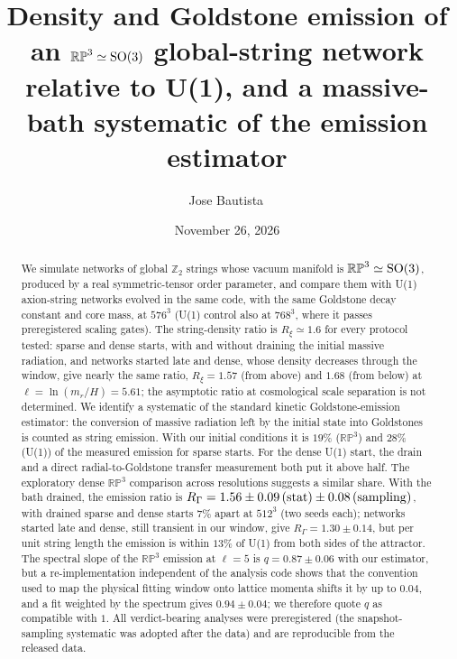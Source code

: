 \documentclass[prd,twocolumn,superscriptaddress,nofootinbib,amsmath,amssymb]{revtex4-2}
\newcommand{\RP}{\mathbb{RP}^3}
\newcommand{\Ztwo}{\mathbb{Z}_2}
\newcommand{\RG}{R_\Gamma}
\newcommand{\Rxi}{R_\xi}
\begin{document}
\title{Density and Goldstone emission of an \texorpdfstring{$\RP\simeq{\rm SO}(3)$}{RP3 = SO(3)} global-string network relative to U(1), and a massive-bath systematic of the emission estimator}
\author{Jose Bautista\,}
\date{November 26, 2026}

\begin{abstract}
We simulate networks of global $\Ztwo$ strings whose vacuum manifold is $\RP\simeq{\rm SO}(3)$, produced by a real symmetric-tensor order parameter, and compare them with U(1) axion-string networks evolved in the same code, with the same Goldstone decay constant and core mass, at $576^3$ (U(1) control also at $768^3$, where it passes preregistered scaling gates).
The string-density ratio is $\Rxi\simeq1.6$ for every protocol tested: sparse and dense starts, with and without draining the initial massive radiation, and networks started late and dense, whose density decreases through the window, give nearly the same ratio, $\Rxi=1.57$ (from above) and $1.68$ (from below) at $\ell=\ln(m_r/H)=5.61$; the asymptotic ratio at cosmological scale separation is not determined.
We identify a systematic of the standard kinetic Goldstone-emission estimator: the conversion of massive radiation left by the initial state into Goldstones is counted as string emission.
With our initial conditions it is $19\%$ ($\RP$) and $28\%$ (U(1)) of the measured emission for sparse starts. For the dense U(1) start, the drain and a direct radial-to-Goldstone transfer measurement both put it above half. The exploratory dense $\RP$ comparison across resolutions suggests a similar share.
With the bath drained, the emission ratio is $\RG=1.56\pm0.09\,({\rm stat})\pm0.08\,({\rm sampling})$, with drained sparse and dense starts $7\%$ apart at $512^3$ (two seeds each); networks started late and dense, still transient in our window, give $\RG=1.30\pm0.14$, but per unit string length the emission is within $13\%$ of U(1) from both sides of the attractor.
The spectral slope of the $\RP$ emission at $\ell=5$ is $q=0.87\pm0.06$ with our estimator, but a re-implementation independent of the analysis code shows that the convention used to map the physical fitting window onto lattice momenta shifts it by up to $0.04$, and a fit weighted by the spectrum gives $0.94\pm0.04$; we therefore quote $q$ as compatible with $1$.
All verdict-bearing analyses were preregistered (the snapshot-sampling systematic was adopted after the data) and are reproducible from the released data.
\end{abstract}
\end{document}
